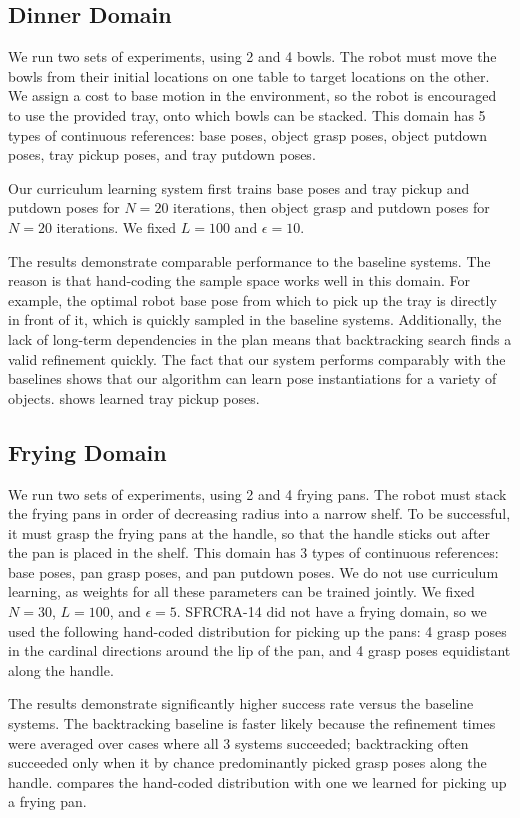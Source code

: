 \subsection{Dinner Domain}
We run two sets of experiments, using 2 and 4 bowls. The robot must move the
bowls from their initial locations on one table to target locations on the other. We assign a cost to
base motion in the environment, so the robot is encouraged to use the provided tray, onto which bowls can be stacked.
This domain has 5 types of continuous references: base poses, object grasp poses, object putdown poses, tray pickup
poses, and tray putdown poses.

Our curriculum learning system first trains base poses and tray pickup and putdown poses for
$N = 20$ iterations, then object grasp and putdown poses for $N = 20$ iterations. We fixed $L = 100$ and $\epsilon = 10$.

The results demonstrate comparable performance to the baseline systems. The reason is that
hand-coding the sample space works well in this domain. For example, the optimal
robot base pose from which to pick up the tray is directly in front of it, which is quickly sampled in
the baseline systems. Additionally, the lack of long-term dependencies in the plan
means that backtracking search finds a valid refinement quickly. The fact that our system performs comparably
with the baselines shows that our algorithm can learn pose instantiations for a variety of objects.
 shows learned tray pickup poses.

\subsection{Frying Domain}
We run two sets of experiments, using 2 and 4 frying pans. The robot must stack the frying pans in order of decreasing
radius into a narrow shelf. To be successful, it must grasp the frying pans at the handle, so that the handle sticks out
after the pan is placed in the shelf. This domain has 3 types of continuous references: base poses, pan grasp poses, and
pan putdown poses. We do not use curriculum learning, as weights for all these parameters can be trained jointly.
We fixed $N = 30$, $L = 100$, and $\epsilon = 5$. SFRCRA-14 did not have a frying domain, so we used the following
hand-coded distribution for picking up the pans: 4 grasp poses in the cardinal directions around the lip of the pan,
and 4 grasp poses equidistant along the handle.

The results demonstrate significantly higher success rate versus the baseline systems. The backtracking baseline is faster likely because
the refinement times were averaged over cases where all 3 systems succeeded; backtracking often succeeded only when
it by chance predominantly picked grasp poses along the handle.  compares the hand-coded
distribution with one we learned for picking up a frying pan.